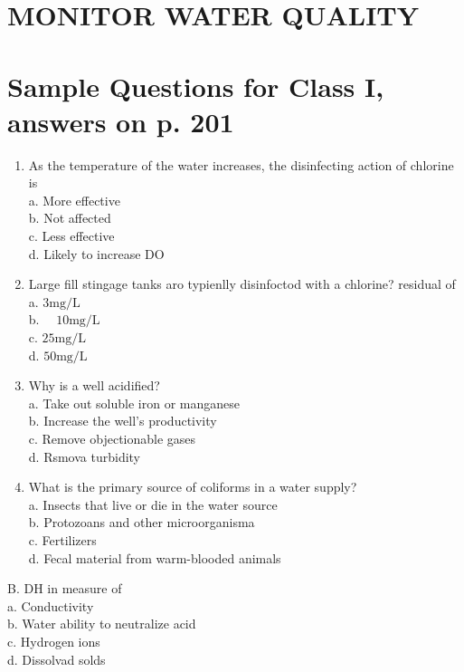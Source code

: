 \documentclass[10pt]{article}
\begin{document}
\section{MONITOR WATER QUALITY}
\section{Sample Questions for Class I, answers on p. 201}
\begin{enumerate}
  \item As the temperature of the water increases, the disinfecting action of chlorine is\\
a. More effective\\
b. Not affected\\
c. Less effective\\
d. Likely to increase DO

  \item Large fill stingage tanks aro typienlly disinfoctod with a chlorine? residual of\\
a. $3 \mathrm{mg} / \mathrm{L}$\\
b. $\quad 10 \mathrm{mg} / \mathrm{L}$\\
c. $25 \mathrm{mg} / \mathrm{L}$\\
d. $50 \mathrm{mg} / \mathrm{L}$

  \item Why is a well acidified?\\
a. Take out soluble iron or manganese\\
b. Increase the well's productivity\\
c. Remove objectionable gases\\
d. Rsmova turbidity

  \item What is the primary source of coliforms in a water supply?\\
a. Insects that live or die in the water source\\
b. Protozoans and other microorganisma\\
c. Fertilizers\\
d. Fecal material from warm-blooded animals

\end{enumerate}

B. $\mathrm{DH}$ in measure of\\
a. Conductivity\\
b. Water ability to neutralize acid\\
c. Hydrogen ions\\
d. Dissolvad solds
\end{document}
